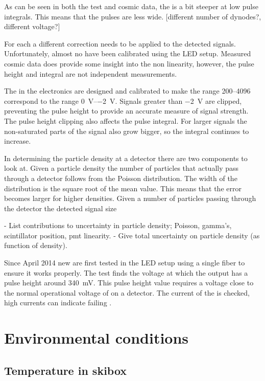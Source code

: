 As can be seen in both the test and cosmic data, the \senstech \pmt is a bit steeper at low pulse integrals. This means that the pulses are less wide. [different number of dynodes?, different voltage?]

For each \senstech \pmt a different correction needs to be applied to the detected signals. Unfortunately, almost no \pmts have been calibrated using the LED setup. Measured cosmic data does provide some insight into the non linearity, however, the pulse height and integral are not independent measurements.

The \adcs in the \hisparc electronics are designed and calibrated to make the range \SIrange{200}{4096}{\adc} correspond to the range \SIrange{0}{-2}{\volt}. Signals greater than \SI{-2}{\volt} are clipped, preventing the pulse height to provide an accurate measure of signal strength. The pulse height clipping also affects the pulse integral. For larger signals the non-saturated parts of the signal also grow bigger, so the integral continues to increase.

In determining the particle density at a detector there are two components to look at. Given a particle density the number of particles that actually pass through a detector follows from the Poisson distribution. The width of the distribution is the square root of the mean value. This means that the error becomes larger for higher densities. Given a number of particles passing through the detector the detected signal size

- List contributions to uncertainty in particle density; Poisson, gamma's, scintillator position, pmt linearity.
- Give total uncertainty on particle density (as function of density).

Since April 2014 new \pmts are first tested in the LED setup using a single fiber to ensure it works properly. The test finds the voltage at which the output has a pulse height around \SI{340}{\milli\volt}. This pulse height value requires a voltage close to the normal operational voltage of \pmts on a \hisparc detector. The current of the \pmt is checked, high currents can indicate failing \pmts.


\section{Environmental conditions}
\label{sec:detector-environmental}

\subsection{Temperature in skibox}

